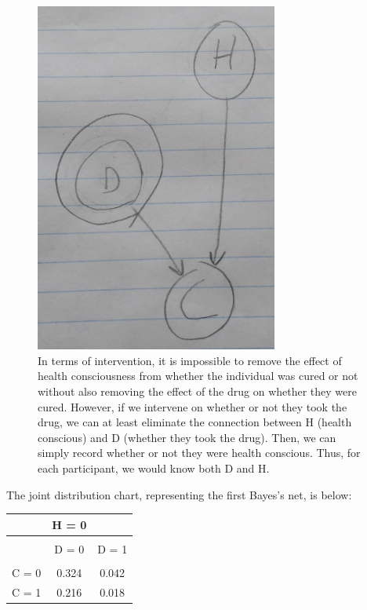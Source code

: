 \documentclass{article}
\begin{document}
\begin{figure}[!ht]
	\centering
	\includegraphics[width=80mm]{figs/drug-bayess-net-experiment.jpg}
	\caption{In terms of intervention, it is impossible to remove the effect 
        of health consciousness from whether the individual was cured or not 
        without also removing the effect of the drug on whether they were cured. 
        However, if we intervene on whether or not they took the drug, we can 
        at least eliminate the connection between H (health conscious) and D 
        (whether they took the drug). Then, we can simply record whether or not 
        they were health conscious. Thus, for each participant, we would know 
        both D and H.}
\end{figure}

The joint distribution chart, representing the first Bayes's net, is below:

\begin{tabular}{c | c c}
          & H = 0 & \\
    \hline \\
          & D = 0 & D = 1 \\
    \hline \\
    C = 0 & 0.324 & 0.042 \\
    C = 1 & 0.216 & 0.018 \\
\end{tabular}

~\\
\end{document}
